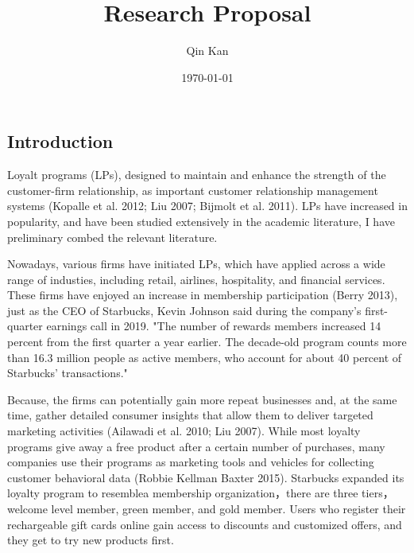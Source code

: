 \documentclass[12pt]{article}
\begin{document}
\title{Research Proposal}
\author{Qin Kan}
\date{\today}
\maketitle
\begin{spacing}{1.5}
\section{Introduction}
 Loyalt programs (LPs), designed to maintain and enhance the strength of the customer-firm relationship, as important customer relationship management systems (Kopalle et al. 2012; Liu 2007; Bijmolt et al. 2011)\cite{kopalle2012joint}\cite{liu2007long}\cite{bijmolt2011loyalty}. LPs have increased in popularity, and have been studied extensively in the academic literature, I have preliminary combed the relevant literature. 

 Nowadays, various firms have initiated LPs, which have applied across a wide range of industies, including retail, airlines, hospitality, and financial services. These firms have enjoyed an increase in membership participation (Berry 2013)\cite{berry2013bulking}, just as the CEO of Starbucks, Kevin Johnson said during the company’s first-quarter earnings call in 2019. "The number of rewards members increased 14 percent from the first quarter a year earlier. The decade-old program counts more than 16.3 million people as active members, who account for about 40 percent of Starbucks’ transactions."

 Because, the firms can potentially gain more repeat businesses and, at the same time, gather detailed consumer insights that allow them to deliver targeted marketing activities (Ailawadi et al. 2010; Liu 2007)\cite{ailawadi2010empirical}\cite{liu2007long}. While most loyalty programs give away a free product after a certain number of purchases, many companies use their programs as marketing tools and vehicles for collecting customer behavioral data (Robbie Kellman Baxter 2015)\cite{baxter2015membership}. Starbucks expanded its loyalty program to resemblea membership organization，there are three tiers， welcome level member, green member, and gold member. Users who register their rechargeable gift cards online gain access to discounts and customized offers, and they get to try new products first. 


\end{spacing}
\end{document}
